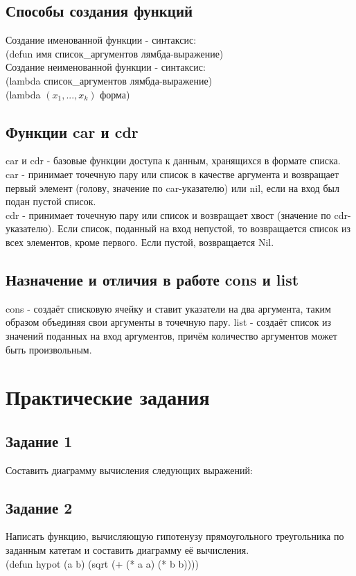 \section{Способы создания функций}
Создание именованной функции - синтаксис:\\
(defun имя список\_аргументов лямбда-выражение)\\

Создание неименованной функции - синтаксис:\\
(lambda список\_аргументов лямбда-выражение)\\
(lambda $(x_{1}, ..., x_{k})$ форма)\\

\section{Функции car и cdr}
car и cdr - базовые функции доступа к данным, хранящихся в формате списка.\\
car - принимает точечную пару или список в качестве аргумента и возвращает первый элемент (голову, значение по car-указателю) или nil, если на вход был подан пустой список.\\

cdr - принимает точечную пару или список и возвращает хвост (значение по cdr-указателю). Если список, поданный на вход непустой, то возвращается список из всех элементов, кроме первого. Если пустой, возвращается Nil.

\section{Назначение и отличия в работе cons и list}
cons - создаёт списковую ячейку и ставит указатели на два аргумента, таким образом объединяя свои аргументы в точечную пару. list - создаёт список из значений поданных на вход аргументов, причём количество аргументов может быть произвольным.\\

\chapter{Практические задания}
\section{Задание 1}
Составить диаграмму вычисления следующих выражений:\\
\newpage
\section{Задание 2}
Написать функцию, вычисляющую гипотенузу прямоугольного
треугольника по заданным катетам и составить диаграмму её вычисления.\\
(defun hypot (a b) (sqrt (+ (* a a) (* b b))))
\newpage
